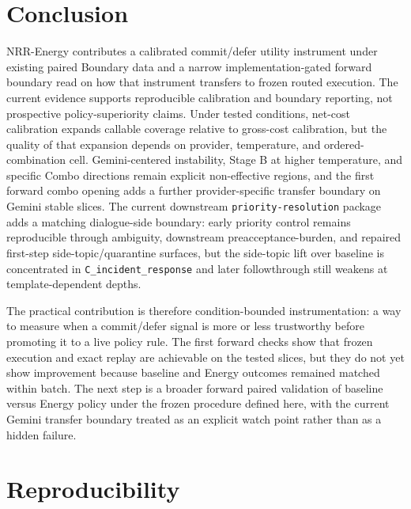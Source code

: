 \documentclass[11pt,a4paper]{article}
\begin{document}
\section{Conclusion}
\label{sec:conclusion}

NRR-Energy contributes a calibrated commit/defer utility instrument under existing paired Boundary data and a narrow implementation-gated forward boundary read on how that instrument transfers to frozen routed execution. The current evidence supports reproducible calibration and boundary reporting, not prospective policy-superiority claims. Under tested conditions, net-cost calibration expands callable coverage relative to gross-cost calibration, but the quality of that expansion depends on provider, temperature, and ordered-combination cell. Gemini-centered instability, Stage B at higher temperature, and specific Combo directions remain explicit non-effective regions, and the first forward combo opening adds a further provider-specific transfer boundary on Gemini stable slices. The current downstream \texttt{priority-resolution} package adds a matching dialogue-side boundary: early priority control remains reproducible through ambiguity, downstream preacceptance-burden, and repaired first-step side-topic/quarantine surfaces, but the side-topic lift over baseline is concentrated in \texttt{C\_incident\_response} and later followthrough still weakens at template-dependent depths.

The practical contribution is therefore condition-bounded instrumentation: a way to measure when a commit/defer signal is more or less trustworthy before promoting it to a live policy rule. The first forward checks show that frozen execution and exact replay are achievable on the tested slices, but they do not yet show improvement because baseline and Energy outcomes remained matched within batch. The next step is a broader forward paired validation of baseline versus Energy policy under the frozen procedure defined here, with the current Gemini transfer boundary treated as an explicit watch point rather than as a hidden failure.

\section{Reproducibility}
\label{sec:repro}
\end{document}
